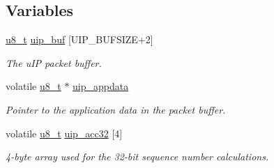 \subsection*{Variables}
\begin{CompactItemize}
\item 
\hyperlink{a00070_ge081489b4906f65a3cb18e9fbe9f8d23}{u8\_\-t} \hyperlink{a00059_gb81e78f890dbbee50c533a9734b74fd9}{uip\_\-buf} \mbox{[}UIP\_\-BUFSIZE+2\mbox{]}
\begin{CompactList}\small\item\em The u\-IP packet buffer. \item\end{CompactList}\item 
volatile \hyperlink{a00070_ge081489b4906f65a3cb18e9fbe9f8d23}{u8\_\-t} $\ast$ \hyperlink{a00059_ge71ae1aa130be22a5f028e76d8d1e31e}{uip\_\-appdata}
\begin{CompactList}\small\item\em Pointer to the application data in the packet buffer. \item\end{CompactList}\item 
\hypertarget{a00059_g838108341703d67d15fc09e0808c2561}{
volatile \hyperlink{a00070_ge081489b4906f65a3cb18e9fbe9f8d23}{u8\_\-t} \hyperlink{a00059_g838108341703d67d15fc09e0808c2561}{uip\_\-acc32} \mbox{[}4\mbox{]}}
\label{a00059_g838108341703d67d15fc09e0808c2561}

\begin{CompactList}\small\item\em 4-byte array used for the 32-bit sequence number calculations. \item\end{CompactList}\end{CompactItemize}
